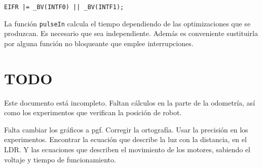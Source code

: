 \documentclass[10pt,a4paper,hidelinks,twocolumn]{article}
\begin{document}
\texttt{EIFR |= \_BV(INTF0) || \_BV(INTF1);}

La función \texttt{pulseIn} calcula el tiempo dependiendo de las optimizaciones
que se produzcan. Es necesario que sea independiente. Además es conveniente
sustituirla por alguna función no bloqueante que emplee interrupciones.


\section{TODO}
Este documento está incompleto. Faltan cálculos en la parte de la odometría, así 
como los experimentos que verifican la posición de robot.

Falta cambiar los gráficos a pgf. Corregir la ortografía. Usar la precisión en 
los experimentos. Encontrar la ecuación que describe la luz con la distancia, en 
el LDR. Y las ecuaciones que describen el movimiento de los motores, sabiendo el 
voltaje y tiempo de funcionamiento.

\end{document}
